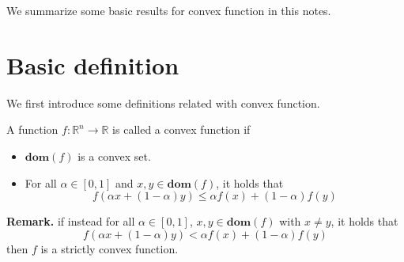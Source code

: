 






We summarize some basic results for convex function in this notes.

\section{Basic definition}
We first introduce some definitions related with convex function.
\begin{definition}
A function $f:\mathbb R^n\rightarrow \mathbb R$ is called a convex function if 
\begin{itemize}
\item $\textbf{dom} (f)$ is a convex set.
\item For all $\alpha\in [0,1]$ and $x, y\in \textbf{dom}(f)$, it holds that
\begin{equation}
f(\alpha x+(1-\alpha)y)\leq \alpha f(x)+(1-\alpha) f(y)
\end{equation}
\end{itemize}
\end{definition}
\textbf{Remark.} if instead for all $\alpha\in [0,1]$, $x, y\in \textbf{dom}(f)$ with $x\neq y$, it holds that
\begin{equation}
f(\alpha x+(1-\alpha)y)< \alpha f(x)+(1-\alpha) f(y)
\end{equation}
then $f$ is a strictly convex function.

